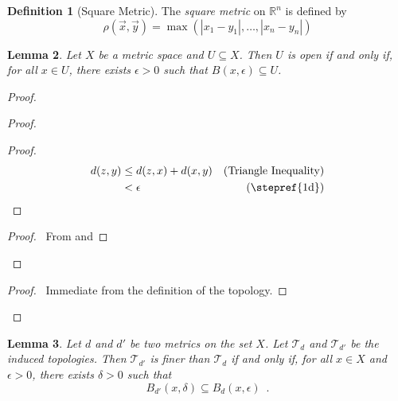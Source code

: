 \documentclass{book}
\newtheorem{lm}{Lemma}[chapter]
\theoremstyle{definition}
\newtheorem{df}[lm]{Definition}
\begin{document}
  \begin{df}[Square Metric]
    The \emph{square metric} on $\mathbb{R}^n$ is defined by
    \[ \rho(\vec{x}, \vec{y}) = \max(|x_1 - y_1|, \ldots, |x_n - y_n|) \]
  \end{df}
  
  \begin{lm}
    \label{lm:topology:metric:open}
    Let $X$ be a metric space and $U \subseteq X$. Then $U$ is open if and only 
    if, for all $x \in U$, there exists $\epsilon > 0$ such that $B(x, 
    \epsilon) 
    \subseteq U$.
  \end{lm}
  
  \begin{proof}
    \begin{proof}
      \begin{proof}
        \pf\ \begin{align*}
          d(z, y) & \leq d(z, x) + d(x, y) & (\text{Triangle Inequality}) \\
          & < \epsilon & (\text{\stepref{1d}})
        \end{align*}
      \end{proof}
      \qedstep
      \begin{proof}
        \pf\ From  and 
      \end{proof}
    \end{proof}
    \begin{proof}
      \pf\ Immediate from the definition of the topology.
    \end{proof}
  \end{proof}
  
  \begin{lm}
    Let $d$ and $d'$ be two metrics on the set $X$. Let $\mathcal{T}_d$ and 
    $\mathcal{T}_{d'}$ be the induced topologies. Then $\mathcal{T}_{d'}$ is 
    finer 
    than $\mathcal{T}_d$ if and only if, for all $x \in X$ and $\epsilon > 0$, 
    there exists $\delta > 0$ such that
    \[ B_{d'}(x, \delta) \subseteq B_d(x, \epsilon) \enspace . \]
  \end{lm}
  
\end{document}
